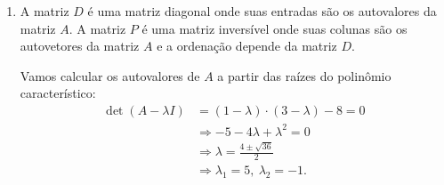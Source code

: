 \documentclass[a4paper,12pt]{article}
\begin{document}
\begin{enumerate}
\begin{enumerate}
    Para construir $P$ de forma que seja uma matriz unitária, devemos normalizar os vetores $v_1$ e $v_2$:
    \begin{align*}
        p_1 = \frac{v_1}{\|v_1\|} = \frac{v_1}{\sqrt{1 + 0.25}} = \frac{2}{\sqrt{5}} v_1 = \frac{1}{\sqrt{5}}\begin{bmatrix}
            2 \\1
        \end{bmatrix}\\
        p_2 = \frac{v_2}{\|v_2\|} = \frac{v_2}{\sqrt{1 + 4}} = \frac{1}{\sqrt{5}} v_2 = \frac{1}{\sqrt{5}}\begin{bmatrix}
            1 \\-2
        \end{bmatrix}
    \end{align*}
    Portanto, $P = \frac{1}{\sqrt{5}}\begin{bmatrix}
        2 & 1\\
        1 & -2\\
    \end{bmatrix}$
    \item $P P^T = \frac{1}{5}\begin{bmatrix}
        2\cdot2 +1 \cdot 1 & 2\cdot1 +1 \cdot (-2)\\
        1\cdot2 -2 \cdot 1 & 1\cdot1 + (-2) \cdot (-2)\\
    \end{bmatrix} = \begin{bmatrix}
        1 & 0\\
       0 & 1\\
    \end{bmatrix}$, ou seja, $P$ é uma matriz unitária.
    \item $\det(A) = \lambda_1 \cdot \lambda_2 = 7 \cdot 2 = 14$ e $\text{Tr}(A) = \lambda_1 + \lambda_2 = 7 + 2 = 9$
    \end{enumerate}
    
    \item A matriz $D$ é uma matriz diagonal onde suas entradas são os autovalores da matriz $A$. A matriz $P$ é uma matriz inversível onde suas colunas são os autovetores da matriz $A$ e a ordenação depende da matriz $D$.
    
    Vamos calcular os autovalores de $A$ a partir das raízes do polinômio característico:
    \begin{align*}
        \det(A - \lambda I) &= (1-\lambda) \cdot (3-\lambda) - 8 = 0\\
        &\Rightarrow -5 - 4\lambda + \lambda^2 = 0 \\
        &\Rightarrow \lambda = \frac{4 \pm \sqrt{36}}{2} \\
        &\Rightarrow \lambda_1 = 5,\ \lambda_2 = -1. \\
    \end{align*}


\end{enumerate}
\end{document}
